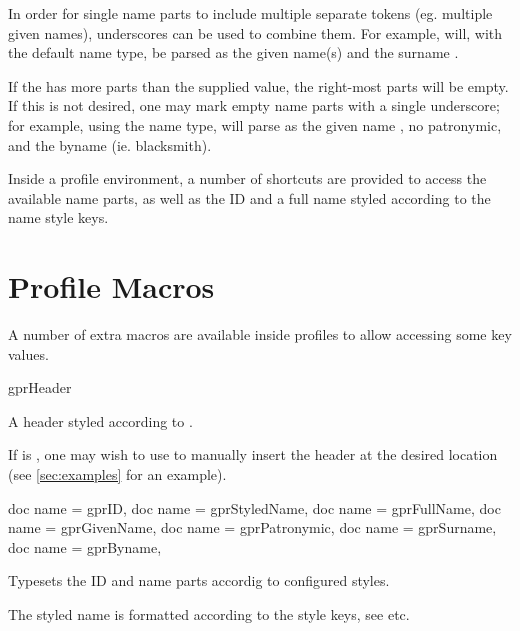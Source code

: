 \documentclass[
	a4paper,
]{article}
\begin{document}
In order for single name parts to include multiple separate tokens (eg. multiple given names), underscores can be used to combine them. For example,  will, with the default  name type, be parsed as the given name(s)  and the surname .

If the  has more parts than the supplied value, the right-most parts will be empty. If this is not desired, one may mark empty name parts with a single underscore; for example, using the  name type,  will parse as the given name , no patronymic, and the byname  (ie. blacksmith).

Inside a profile environment, a number of shortcuts are provided to access the available name parts, as well as the ID and a full name styled according to the name style keys.


\clearpage
\section{Profile Macros} %

A number of extra macros are available inside profiles to allow accessing some key values.

\begin{docCommand}
	{gprHeader}
	{\brackets{}}

	A header styled according to .

	If  is , one may wish to use  to manually insert the header at the desired location (see \cref{sec:examples} for an example).

\end{docCommand}


\begin{docCommands}[
		doc parameter = {\brackets{}}
	]
	{
		{ doc name = gprID},
		{ doc name = gprStyledName},
		{ doc name = gprFullName},
		{ doc name = gprGivenName},
		{ doc name = gprPatronymic},
		{ doc name = gprSurname},
		{ doc name = gprByname},
	}

	Typesets the ID and name parts accordig to configured styles.

	The styled name is formatted according to the style keys, see  etc.
	
\end{docCommands}
\end{document}
